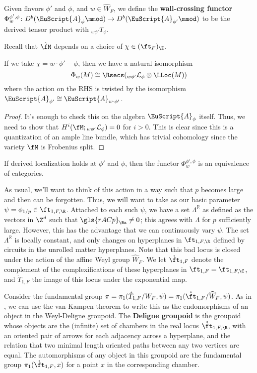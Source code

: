 \begin{definition}
Given flavors $\phi'$ and $\phi$, and $w\in \widehat{W}_F$, we define the {\bf wall-crossing functor} $\Phi_w^{\phi',\phi}\colon D^b(\EuScript{A}_{\phi}\mmod) \to D^b(\EuScript{A}_{\phi'}\mmod)$ to be the derived tensor product with ${}_{w\phi'}T_{\phi}$.
\end{definition}

Recall that $\tilde{\fM}$ depends on a choice of $\chi\in (\ft_F)_{\Z}$.  
\begin{proposition}
If we take $\chi=w\cdot \phi'-\phi$, then we have a natural isomorphism \[\Phi_w(M)\cong\Rsecs({}_{w\phi'}\mathcal{L}_{\phi}\otimes \LLoc(M))\] where the action on the RHS is twisted by the isomorphism $\EuScript{A}_{\phi'}\cong \EuScript{A}_{w\cdot \phi'}$.  
\end{proposition}
\begin{proof}
It's enough to check this on the algebra $\EuScript{A}_{\phi}$ itself. Thus, we need to show that $H^i(\fM;{}_{w\phi'}\mathcal{L}_{\phi})=0$ for $i>0$.  This is clear since this is a quantization of an ample line bundle, which has trivial cohomology since the variety $\fM$ is Frobenius split.
\end{proof}

\begin{corollary}
If derived localization holds at $\phi'$ and $\phi$, then the functor $\Phi_w^{\phi',\phi}$ is an equivalence of categories. 
\end{corollary}


As usual, we'll want to think of this action in a way such that $p$ becomes large and then can be forgotten.  Thus, we will want to take as our basic parameter $\psi=\phi_{1/p}\in \ft_{1,F,\R}$. Attached to each such $\psi$, we have a set $\Lambda^{\mathbb{R}}$ as defined as the vectors in $\Z^d$ such that $\gls{rACp}_{\Ba}\neq 0$; this agrees with $\Lambda$ for $p$ sufficiently large.  However, this has the advantage that we can continuously vary $\psi$.  The set $\Lambda^{\mathbb{R}}$ is locally constant, and only changes on hyperplanes in $\ft_{1,F,\R}$ defined by circuits in the unrolled matter hyperplanes.  Note that this bad locus is  closed under the action of the affine Weyl group $\widehat{W}_F$.  We let $\mathring{\ft}_{1,F}$ denote the complement of the complexifications of these hyperplanes in $\ft_{1,F}=\ft_{1,F,\C}$, and $\mathring{T}_{1,F}$ the image of this locus under the exponential map.



Consider the fundamental group $\pi=\pi_1(\mathring{T}_{1,F}/W_F,\psi)=\pi_1(\mathring{\ft}_{1,F}/\widehat{W}_F,\psi)$.  As in \cite[\S 6]{BLPWgco}, we can use the van-Kampen theorem to write this as the endomorphisms of an object in the Weyl-Deligne groupoid. The {\bf Deligne groupoid} is the groupoid whose objects are the (infinite) set of chambers in the real locus $\mathring{\ft}_{1,F,\R}$, with an oriented pair of arrows for each adjacency across a hyperplane, and the relation that two minimal length oriented paths between any two vertices are equal.  The automorphisms of any object in this groupoid are
the fundamental group $\pi_1(\mathring{\ft}_{1,F},x)$ for a point $x$ in the corresponding chamber.

